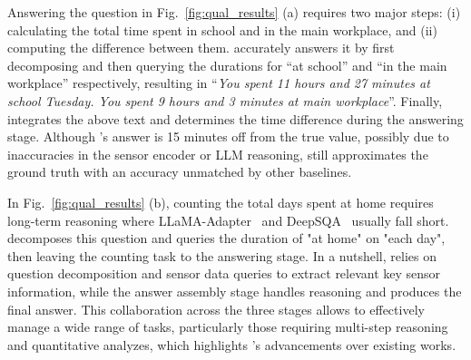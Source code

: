 Answering the question in Fig.~\ref{fig:qual_results} (a) requires two major steps: (i) calculating the total time spent in school and in the main workplace, and (ii) computing the difference between them.
\Method accurately answers it by first decomposing and then querying the durations for ``at school'' and ``in the main workplace'' respectively, resulting in ``\textit{You spent 11 hours and 27 minutes at school Tuesday. You spent 9 hours and 3 minutes at main workplace}''. Finally, \Method integrates the above text and determines the time difference during the answering stage.
Although \Method's answer is 15 minutes off from the true value, possibly due to inaccuracies in the sensor encoder or LLM reasoning, \Method still approximates the ground truth with an accuracy unmatched by other baselines.


In Fig.~\ref{fig:qual_results} (b), counting the total days spent at home requires long-term reasoning where  LLaMA-Adapter~\cite{zhang2023llama} and  DeepSQA~\cite{xing2021deepsqa} usually fall short.
\Method decomposes this question and queries the duration of "at home" on "each day", then leaving the counting task to the answering stage.
In a nutshell, \Method relies on question decomposition and sensor data queries to extract relevant key sensor information, while the answer assembly stage handles reasoning and produces the final answer.
This collaboration across the three stages allows \Method to effectively manage a wide range of tasks, particularly those requiring multi-step reasoning and quantitative analyzes, which highlights \Method's advancements over existing works.


